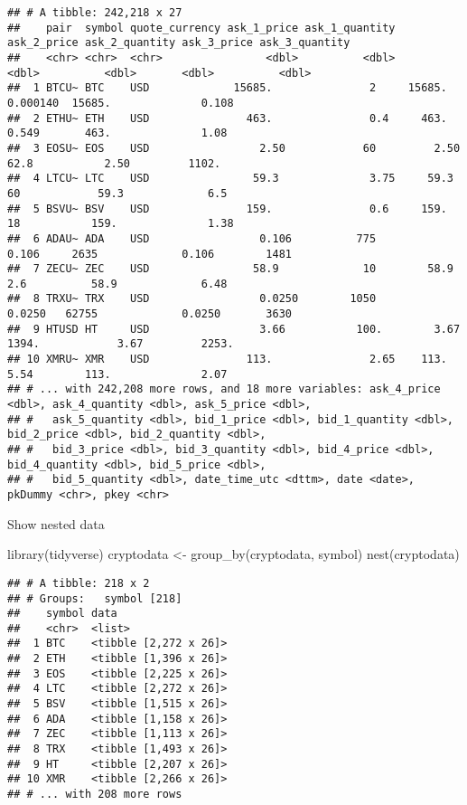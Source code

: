 \documentclass[
]{book}
\newenvironment{Shaded}{\begin{snugshade}}{\end{snugshade}}
\newcommand{\FunctionTok}[1]{\textcolor[rgb]{0.00,0.00,0.00}{#1}}
\newcommand{\NormalTok}[1]{#1}
\newcommand{\OtherTok}[1]{\textcolor[rgb]{0.56,0.35,0.01}{#1}}
\begin{document}
\begin{verbatim}
## # A tibble: 242,218 x 27
##    pair  symbol quote_currency ask_1_price ask_1_quantity ask_2_price ask_2_quantity ask_3_price ask_3_quantity
##    <chr> <chr>  <chr>                <dbl>          <dbl>       <dbl>          <dbl>       <dbl>          <dbl>
##  1 BTCU~ BTC    USD             15685.               2     15685.           0.000140  15685.              0.108
##  2 ETHU~ ETH    USD               463.               0.4     463.           0.549       463.              1.08 
##  3 EOSU~ EOS    USD                 2.50            60         2.50        62.8           2.50         1102.   
##  4 LTCU~ LTC    USD                59.3              3.75     59.3         60            59.3             6.5  
##  5 BSVU~ BSV    USD               159.               0.6     159.          18           159.              1.38 
##  6 ADAU~ ADA    USD                 0.106          775         0.106     2635             0.106        1481    
##  7 ZECU~ ZEC    USD                58.9             10        58.9          2.6          58.9             6.48 
##  8 TRXU~ TRX    USD                 0.0250        1050         0.0250   62755             0.0250       3630    
##  9 HTUSD HT     USD                 3.66           100.        3.67      1394.            3.67         2253.   
## 10 XMRU~ XMR    USD               113.               2.65    113.           5.54        113.              2.07 
## # ... with 242,208 more rows, and 18 more variables: ask_4_price <dbl>, ask_4_quantity <dbl>, ask_5_price <dbl>,
## #   ask_5_quantity <dbl>, bid_1_price <dbl>, bid_1_quantity <dbl>, bid_2_price <dbl>, bid_2_quantity <dbl>,
## #   bid_3_price <dbl>, bid_3_quantity <dbl>, bid_4_price <dbl>, bid_4_quantity <dbl>, bid_5_price <dbl>,
## #   bid_5_quantity <dbl>, date_time_utc <dttm>, date <date>, pkDummy <chr>, pkey <chr>
\end{verbatim}

Show nested data

\begin{Shaded}
\begin{Highlighting}[]
\FunctionTok{library}\NormalTok{(tidyverse)}
\NormalTok{cryptodata }\OtherTok{\textless{}{-}} \FunctionTok{group\_by}\NormalTok{(cryptodata, symbol)}
\FunctionTok{nest}\NormalTok{(cryptodata)}
\end{Highlighting}
\end{Shaded}

\begin{verbatim}
## # A tibble: 218 x 2
## # Groups:   symbol [218]
##    symbol data                 
##    <chr>  <list>               
##  1 BTC    <tibble [2,272 x 26]>
##  2 ETH    <tibble [1,396 x 26]>
##  3 EOS    <tibble [2,225 x 26]>
##  4 LTC    <tibble [2,272 x 26]>
##  5 BSV    <tibble [1,515 x 26]>
##  6 ADA    <tibble [1,158 x 26]>
##  7 ZEC    <tibble [1,113 x 26]>
##  8 TRX    <tibble [1,493 x 26]>
##  9 HT     <tibble [2,207 x 26]>
## 10 XMR    <tibble [2,266 x 26]>
## # ... with 208 more rows
\end{verbatim}
\end{document}
